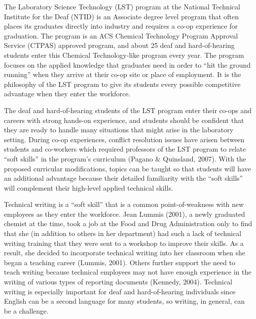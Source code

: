 \documentclass[11.5pt]{sig-alternate} %
\begin{document}
\begin{large}
The Laboratory Science Technology (LST) program at the National Technical Institute for the Deaf (NTID) is an Associate degree level program that often places its graduates directly into industry and requires a co-op experience for graduation. The program is an ACS Chemical Technology Program Approval Service (CTPAS) approved program, and about 25 deaf and hard-of-hearing students enter this Chemical Technology-like program every year. The program focuses on the applied knowledge that graduates need in order to “hit the ground running” when they arrive at their co-op site or place of employment. It is the philosophy of the LST program to give its students every possible competitive advantage when they enter the workforce. 

The deaf and hard-of-hearing students of the LST program enter their co-ops and careers with strong hands-on experience, and students should be confident that they are ready to handle many situations that might arise in the laboratory setting. During co-op experiences, conflict resolution issues have arisen between students and co-workers which required professors of the LST program to relate “soft skills” in the program’s curriculum (Pagano \& Quinsland, 2007). With the proposed curricular modifications, topics can be taught so that students will have an additional advantage because their detailed familiarity with the “soft skills” will complement their high-level applied technical skills. 

Technical writing is a “soft skill” that is a common point-of-weakness with new employees as they enter the workforce. Jean Lummis (2001), a newly graduated chemist at the time, took a job at the Food and Drug Administration only to find that she (in addition to others in her department) had such a lack of technical writing training that they were sent to a workshop to improve their skills. As a result, she decided to incorporate technical writing into her classroom when she began a teaching career (Lummis, 2001). Others further support the need to teach writing because technical employees may not have enough experience in the writing of various types of reporting documents (Kennedy, 2004). Technical writing is especially important for deaf and hard-of-hearing individuals since English can be a second language for many students, so writing, in general, can be a challenge.


\end{large}
\end{document}
